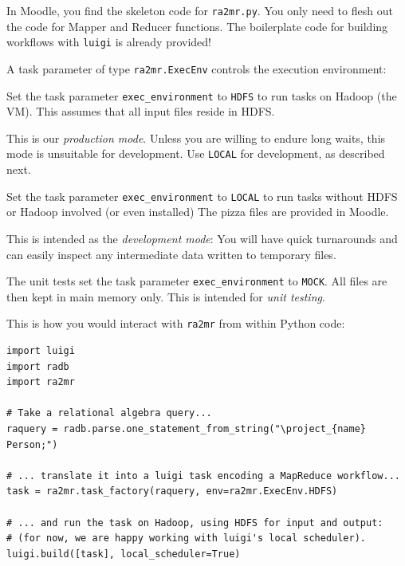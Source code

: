 \documentclass[12pt]{exam}
\begin{document}
\begin{questions}
\begin{itemize}
\end{itemize}


In Moodle, you find the skeleton code for \verb!ra2mr.py!. You only need to flesh out the code for Mapper and Reducer functions. The boilerplate code for building workflows with \verb!luigi! is already provided!

A task parameter of type \verb!ra2mr.ExecEnv! controls the execution environment:
%
\begin{compactitem}

    \item Set the task parameter \verb!exec_environment! to \verb!HDFS! to run tasks on Hadoop (the VM). This assumes that all input files reside in HDFS.
    
    This is our {\em production mode}\/. Unless you are willing to endure long waits, this mode is unsuitable for development. Use \verb!LOCAL! for development, as described next.
    
    \item Set the task parameter \verb!exec_environment! to \verb!LOCAL! to run tasks without HDFS or Hadoop involved (or even installed)
    The pizza files are provided in Moodle.
    
    This is intended as the {\em development mode}: You will have quick turnarounds and can easily inspect any intermediate data written to temporary files.
    
    \item The unit tests set the task parameter \verb!exec_environment! to \verb!MOCK!. All files are then kept in main memory only.
    This is intended for {\em unit testing}.
    
\end{compactitem}




This is how you would interact with \verb!ra2mr! from within Python code:

\begin{Verbatim}[frame=single, fontsize=\small]
import luigi
import radb
import ra2mr

# Take a relational algebra query...
raquery = radb.parse.one_statement_from_string("\project_{name} Person;")

# ... translate it into a luigi task encoding a MapReduce workflow...
task = ra2mr.task_factory(raquery, env=ra2mr.ExecEnv.HDFS)

# ... and run the task on Hadoop, using HDFS for input and output:
# (for now, we are happy working with luigi's local scheduler).
luigi.build([task], local_scheduler=True)


\end{Verbatim}
\end{questions}
\end{document}
